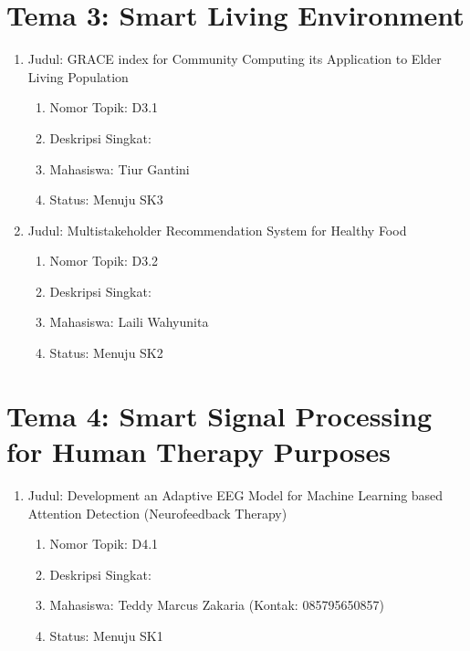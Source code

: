 \documentclass[
  letterpaper,
  DIV=11,
  numbers=noendperiod]{scrreprt}
\providecommand{\tightlist}{%
  \setlength{\itemsep}{0pt}\setlength{\parskip}{0pt}}
\begin{document}
\section{Tema 3: Smart Living
Environment}\label{tema-3-smart-living-environment-3}

\begin{enumerate}
\def\labelenumi{\arabic{enumi}.}
\tightlist
\item
  Judul: GRACE index for Community Computing its Application to Elder
  Living Population

  \begin{enumerate}
  \def\labelenumii{\arabic{enumii}.}
  \tightlist
  \item
    Nomor Topik: D3.1
  \item
    Deskripsi Singkat:
  \item
    Mahasiswa: Tiur Gantini
  \item
    Status: Menuju SK3
  \end{enumerate}
\item
  Judul: Multistakeholder Recommendation System for Healthy Food

  \begin{enumerate}
  \def\labelenumii{\arabic{enumii}.}
  \tightlist
  \item
    Nomor Topik: D3.2
  \item
    Deskripsi Singkat:
  \item
    Mahasiswa: Laili Wahyunita
  \item
    Status: Menuju SK2
  \end{enumerate}
\end{enumerate}

\section{Tema 4: Smart Signal Processing for Human Therapy
Purposes}\label{tema-4-smart-signal-processing-for-human-therapy-purposes-3}

\begin{enumerate}
\def\labelenumi{\arabic{enumi}.}
\tightlist
\item
  Judul: Development an Adaptive EEG Model for Machine Learning based
  Attention Detection (Neurofeedback Therapy)

  \begin{enumerate}
  \def\labelenumii{\arabic{enumii}.}
  \tightlist
  \item
    Nomor Topik: D4.1
  \item
    Deskripsi Singkat:
  \item
    Mahasiswa: Teddy Marcus Zakaria (Kontak: 085795650857)
  \item
    Status: Menuju SK1
  \end{enumerate}
\end{enumerate}
\end{document}
